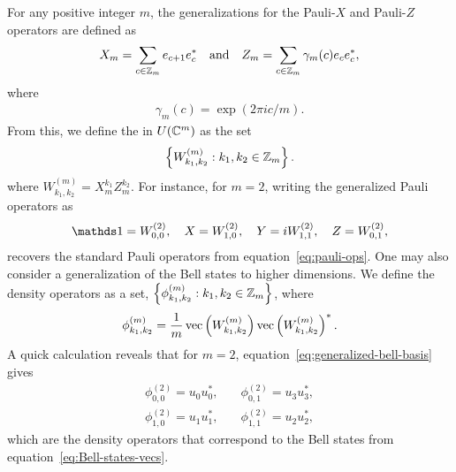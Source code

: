 For any positive integer $m$, the generalizations for the Pauli-$X$ and Pauli-$Z$ operators are defined as 
\begin{align}
	X_m = \sum_{c \in \integer_m} e_{c+1} e_c^* \quad \textnormal{and} \quad Z_m = \sum_{c \in \integer_m} \gamma_m(c) e_c e_c^*,
\end{align}
where 
\begin{align}
	\gamma_m(c) = \exp(2 \pi i c / m).
\end{align}
From this, we define the  in $U(\complex^m)$ as the set
\begin{align} \label{eq:generalized-pauli-ops}
	\left \{ W_{k_1,k_2}^{(m)} : k_1, k_2 \in \integer_m \right \}.
\end{align}
where $W_{k_1, k_2}^{(m)} = X_m^{k_1} Z_m^{k_2}$. For instance, for $m = 2$, writing the generalized Pauli operators as
\begin{align}
	\I = W_{0,0}^{(2)}, \quad X = W_{1,0}^{(2)}, \quad Y = i W_{1,1}^{(2)}, \quad Z = W_{0,1}^{(2)},
\end{align}
recovers the standard Pauli operators from equation~\eqref{eq:pauli-ops}. One may also consider a generalization of the Bell states to higher dimensions. We define the  density operators as a set, $\left \{ \phi^{(m)}_{k_1,k_2} : k_1,k_2 \in \integer_m \right \}$, where
\begin{align} \label{eq:generalized-bell-basis}
	\phi^{(m)}_{k_1,k_2} = \frac{1}{m} \vec \left( W^{(m)}_{k_1, k_2} \right) \vec \left( W^{(m)}_{k_1,k_2} \right)^*.
\end{align}
A quick calculation reveals that for $m = 2$, equation~\eqref{eq:generalized-bell-basis} gives 
\begin{equation}
	\begin{aligned}
		\phi_{0,0}^{(2)} = u_0 u_0^*, &\quad \phi_{0,1}^{(2)} = u_3 u_3^*, \\
		\phi_{1,0}^{(2)} = u_1 u_1^*, &\quad \phi_{1,1}^{(2)} = u_2 u_2^*,
	\end{aligned}
\end{equation}
which are the density operators that correspond to the Bell states from equation~\eqref{eq:Bell-states-vecs}.

